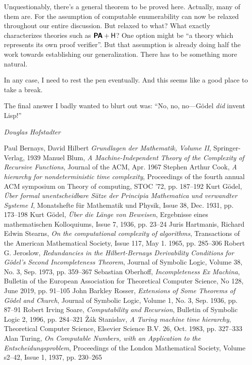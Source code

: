 \documentclass{article}
\theoremstyle{customstyle}
\newcommand{\PA}{\textbf{\textsf{PA}}}
\begin{document}
Unquestionably, there's a general theorem to be proved here. Actually, many of them are. For the assumption of computable enumerability can now be relaxed throughout our entire discussion. But relaxed to what? What exactly characterizes theories such as $\PA + \mathsf{H}$? One option might be ``a theory which represents its own proof verifier''. But that assumption is already doing half the work towards establishing our generalization. There has to be something more natural.

In any case, I need to rest the pen eventually. And this seems like a good place to take a break.

\epigraph{The final answer I badly wanted to blurt out was: ``No, no, no---Gödel \emph{did} invent Lisp!''}{\textit{Douglas Hofstadter}}

\begin{thebibliography}{12}
  Paul Bernays, David Hilbert \textit{Grundlagen der Mathematik, Volume II}, Springer-Verlag, 1939
  Manuel Blum, \textit{A Machine-Independent Theory of the Complexity of Recursive Functions}, Journal of the ACM, Apr. 1967
  Stephen Arthur Cook, \textit{A hierarchy for nondeterministic time complexity}, Proceedings of the fourth annual ACM symposium on Theory of computing, STOC '72, pp. 187--192
  Kurt Gödel, \textit{Über formal unentscheidbare Sätze der Principia Mathematica und verwandter Systeme I}, Monatshefte für Mathematik und Physik, Issue 38, Dec. 1931, pp. 173--198
  Kurt Gödel, \textit{Über die Länge von Beweisen}, Ergebnisse eines mathematischen Kolloquiums, Issue 7, 1936, pp. 23--24
  Juris Hartmanis, Richard Edwin Stearns, \textit{On the computational complexity of algorithms}, Transactions of the American Mathematical Society, Issue 117, May 1. 1965, pp. 285--306
  Robert G. Jeroslow, \textit{Redundancies in the Hilbert-Bernays Derivability Conditions for Gödel's Second Incompleteness Theorem}, Journal of Symbolic Logic, Volume 38, No. 3, Sep. 1973, pp. 359--367
  Sebastian Oberhoff, \textit{Incompleteness Ex Machina}, Bulletin of the European Association for Theoretical Computer Science, No 128, June 2019, pp. 91--105
  John Barkley Rosser, \textit{Extensions of Some Theorems of Gödel and Church}, Journal of Symbolic Logic, Volume 1, No. 3, Sep. 1936, pp. 87--91
  Robert Irving Soare, \textit{Computability and Recursion}, Bulletin of Symbolic Logic 2, 1996, pp. 284--321
  \v{Z}ák Stanislav, \textit{A Turing machine time hierarchy}, Theoretical Computer Science, Elsevier Science B.V. 26, Oct. 1983, pp. 327--333
  Alan Turing, \textit{On Computable Numbers, with an Application to the Entscheidungsproblem}, Proceedings of the London Mathematical Society, Volume s2--42, Issue 1, 1937, pp. 230--265
\end{thebibliography}

\vfill\eject
\end{document}
